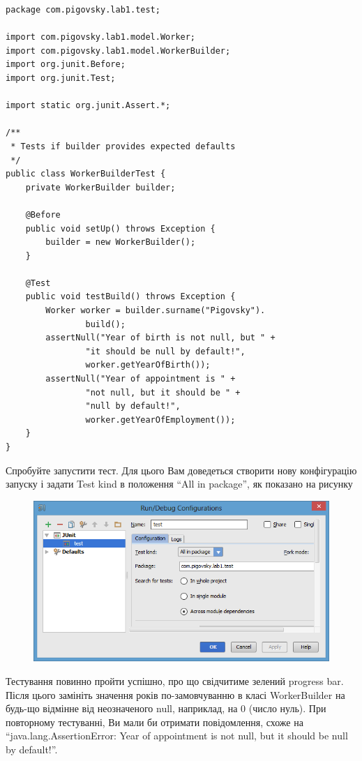 \begin{lstlisting}
package com.pigovsky.lab1.test;

import com.pigovsky.lab1.model.Worker;
import com.pigovsky.lab1.model.WorkerBuilder;
import org.junit.Before;
import org.junit.Test;

import static org.junit.Assert.*;

/**
 * Tests if builder provides expected defaults
 */
public class WorkerBuilderTest {
    private WorkerBuilder builder;

    @Before
    public void setUp() throws Exception {
        builder = new WorkerBuilder();
    }

    @Test
    public void testBuild() throws Exception {
        Worker worker = builder.surname("Pigovsky").
                build();
        assertNull("Year of birth is not null, but " +
                "it should be null by default!",
                worker.getYearOfBirth());
        assertNull("Year of appointment is " +
                "not null, but it should be " +
                "null by default!",
                worker.getYearOfEmployment());
    }
}
\end{lstlisting}

Спробуйте запустити тест. Для цього Вам доведеться створити нову конфігурацію запуску і задати Test kind в положення ``All in package'', як показано на рисунку
\begin{figure}[H]
\includegraphics{testRunConfiguration}
\end{figure}

Тестування повинно пройти успішно, про що свідчитиме зелений progress bar. Після цього замініть значення років по-замовчуванню в класі WorkerBuilder на будь-що відмінне від неозначеного null, наприклад, на 0 (число нуль).
При повторному тестуванні, Ви мали би отримати повідомлення, схоже на ``java.lang.AssertionError: Year of appointment is not null, but it should be null by default!''.


